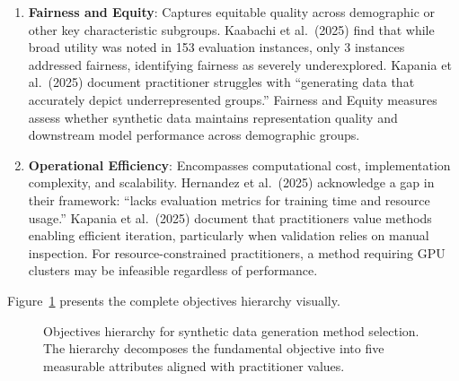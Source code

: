 \documentclass[12pt,a4paper]{article}
\begin{document}
\begin{enumerate}
    \item \textbf{Fairness and Equity}: Captures equitable quality across demographic or other key characteristic subgroups. Kaabachi et al.\ (2025) find that while broad utility was noted in 153 evaluation instances, only 3 instances addressed fairness, identifying fairness as severely underexplored. Kapania et al.\ (2025) document practitioner struggles with ``generating data that accurately depict underrepresented groups.'' Fairness and Equity measures assess whether synthetic data maintains representation quality and downstream model performance across demographic groups.
    
    \item \textbf{Operational Efficiency}: Encompasses computational cost, implementation complexity, and scalability. Hernandez et al.\ (2025) acknowledge a gap in their framework: ``lacks evaluation metrics for training time and resource usage.'' Kapania et al.\ (2025) document that practitioners value methods enabling efficient iteration, particularly when validation relies on manual inspection. For resource-constrained practitioners, a method requiring GPU clusters may be infeasible regardless of performance.
\end{enumerate}

Figure~\ref{fig:hierarchy} presents the complete objectives hierarchy visually.

\begin{figure}[htbp]
\centering
{}
\caption{Objectives hierarchy for synthetic data generation method selection. The hierarchy decomposes the fundamental objective into five measurable attributes aligned with practitioner values.}
\label{fig:hierarchy}
\end{figure}
\end{document}
